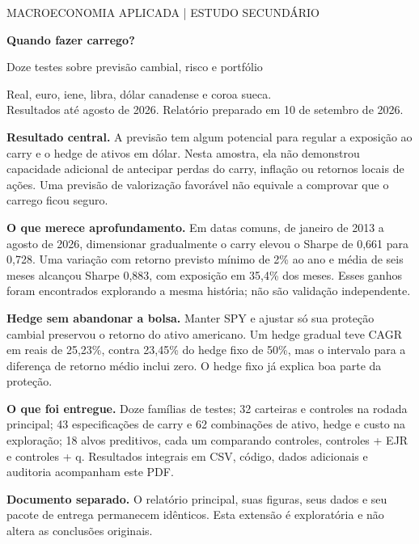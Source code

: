 \documentclass[11pt,a4paper]{article}
\begin{document}
\thispagestyle{empty}
{\large\color{navy}MACROECONOMIA APLICADA \quad | \quad ESTUDO SECUNDÁRIO}
\vspace{1cm}

{\Huge\bfseries\color{navy}Quando fazer carrego?}
\vspace{.35cm}

{\Large Doze testes sobre previsão cambial, risco e portfólio}
\vspace{.5cm}

Real, euro, iene, libra, dólar canadense e coroa sueca.\\
Resultados até agosto de 2026. Relatório preparado em 10 de setembro de 2026.
\vspace{.6cm}

\textbf{Resultado central.} A previsão tem algum potencial para regular a exposição ao carry e o hedge de ativos em dólar. Nesta amostra, ela não demonstrou capacidade adicional de antecipar perdas do carry, inflação ou retornos locais de ações. Uma previsão de valorização favorável não equivale a comprovar que o carrego ficou seguro.

\textbf{O que merece aprofundamento.} Em datas comuns, de janeiro de 2013 a agosto de 2026, dimensionar gradualmente o carry elevou o Sharpe de 0,661 para 0,728. Uma variação com retorno previsto mínimo de 2\% ao ano e média de seis meses alcançou Sharpe 0,883, com exposição em 35,4\% dos meses. Esses ganhos foram encontrados explorando a mesma história; não são validação independente.

\textbf{Hedge sem abandonar a bolsa.} Manter SPY e ajustar só sua proteção cambial preservou o retorno do ativo americano. Um hedge gradual teve CAGR em reais de 25,23\%, contra 23,45\% do hedge fixo de 50\%, mas o intervalo para a diferença de retorno médio inclui zero. O hedge fixo já explica boa parte da proteção.

\textbf{O que foi entregue.} Doze famílias de testes; 32 carteiras e controles na rodada principal; 43 especificações de carry e 62 combinações de ativo, hedge e custo na exploração; 18 alvos preditivos, cada um comparando controles, controles + EJR e controles + q. Resultados integrais em CSV, código, dados adicionais e auditoria acompanham este PDF.

\vfill
\colorbox{light}{\parbox{.94\linewidth}{\textbf{Documento separado.} O relatório principal, suas figuras, seus dados e seu pacote de entrega permanecem idênticos. Esta extensão é exploratória e não altera as conclusões originais.}}
\end{document}
